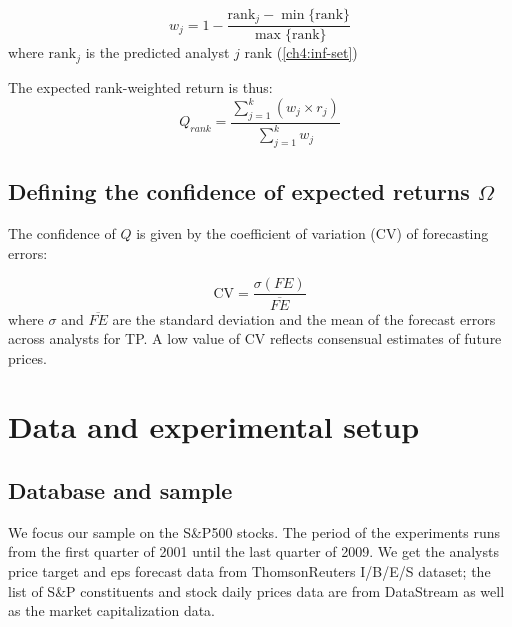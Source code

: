 \documentclass[a4paper,twoside,12pt,openright,notitlepage]{report}\usepackage[]{graphicx}\usepackage[]{color}
\begin{document}
\begin{equation}
\label{ch4-eq:weight}
w_{j}=1-\frac{\mathrm{rank}_{j}-\min{ \{\mathrm{rank} \} }}{\max{\{\mathrm{rank} \}}}
\end{equation}
where $\mathrm{rank}_j$ is the predicted analyst $j$ rank (\ref{ch4:inf-set})

The expected rank-weighted return is thus:
\begin{equation}
\label{ch4-rankq}
Q_{rank}=\frac{\sum_{j=1}^{k} (w_{j} \times r_{j})}{\sum_{j=1}^{k} w_{j}}
\end{equation}



\subsection{Defining the confidence of expected returns $\Omega$}
\label{ch4-def-omega}
The confidence of $Q$ is given by the coefficient of variation (CV) of forecasting errors:

\begin{equation}
\label{ch4-eq-cv}
\mathrm{CV} = \frac{\sigma (FE)}{\overline{FE}}
\end{equation}
where $\sigma$ and $\overline{FE}$ are the standard deviation and the mean of the forecast errors across analysts for TP. A low value of $\mathrm{CV}$ reflects consensual estimates of future prices.






\section{Data and experimental setup}
\label{ch4-sec:data}
\subsection{Database and sample}
We focus our sample on the  S\&P500 stocks. The period of the experiments runs from the first quarter of 2001 until the last quarter of 2009. We get the analysts price target and \gls{eps} forecast data from ThomsonReuters I/B/E/S dataset; the list of S\&P constituents and stock daily prices data are from DataStream as well as the market capitalization data.
\end{document}
